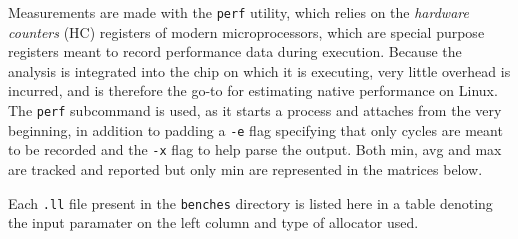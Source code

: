 \documentclass{article}
\begin{document}
Measurements are made with the \lstinline!perf! utility, which relies on the \textit{hardware counters} (HC) registers of modern microprocessors, which are special purpose registers meant to record performance data during execution. Because the analysis is integrated into the chip on which it is executing, very little overhead is incurred, and is therefore the go-to for estimating native performance on Linux. The \lstinline!perf! subcommand is used, as it starts a process and attaches from the very beginning, in addition to padding a \lstinline!-e! flag specifying that only cycles are meant to be recorded and the \lstinline!-x! flag to help parse the output. Both min, avg and max are tracked and reported but only min are represented in the matrices below.

Each \lstinline!.ll! file present in the \lstinline!benches! directory is listed here in a table denoting the input paramater on the left column and type of allocator used.


%










\end{document}
